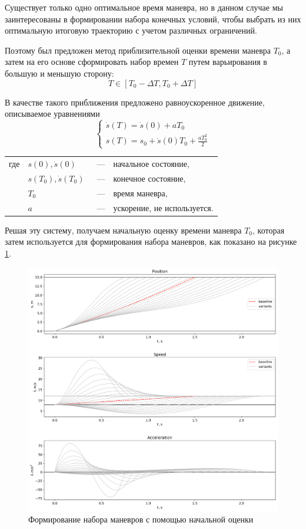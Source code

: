 Существует только одно оптимальное время маневра, но в данном случае мы заинтересованы в формировании
набора конечных условий, чтобы выбрать из них оптимальную итоговую траекторию с учетом различных ограничений.

Поэтому был предложен метод приблизительной оценки времени маневра $T_0$, а затем на его основе сформировать
набор времен $T$ путем варьирования в большую и меньшую сторону:
\begin{equation}
    T \in [T_0 - \Delta T, T_0 + \Delta T]
\end{equation}

В качестве такого приближения предложено равноускоренное движение, описываемое уравнениями
\begin{equation}
    \begin{cases}
    \dot{s}(T) = \dot{s}(0) + aT_0 \\
    s(T) = s_0 + \dot{s}(0)T_0 + \frac{aT_0^2}{2}
    \end{cases}
\end{equation}
\noindent\begin{tabularx}{\linewidth}{lllX}
    где & $s(0), \dot{s}(0)$         &~---& начальное состояние, \\
        & $s(T_0), \dot{s}(T_0)$     &~---& конечное состояние, \\
        & $T_0$                      &~---& время маневра, \\
       & $a$                         &~---& ускорение, не используется.
\end{tabularx}

Решая эту систему, получаем начальную оценку времени маневра $T_0$, которая затем используется для
формирования набора маневров, как показано на рисунке \ref{img:quintic_t_estimate}.

\begin{figure}[h]
    \centering
    \includegraphics[width=1\textwidth]{images/quintic_t_estimate}
    \caption{Формирование набора маневров с помощью начальной оценки}
    \label{img:quintic_t_estimate}
\end{figure}

